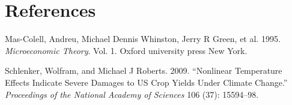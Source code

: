 \documentclass[
  12pt,
  letterpaper,
  DIV=11,
  numbers=noendperiod]{scrartcl}
\newlength{\cslhangindent}
\newlength{\cslentryspacingunit} %
\newenvironment{CSLReferences}[2] %
 {%
  \setlength{\parindent}{0pt}
  \ifodd #1
  \let\oldpar\par
  \def\par{\hangindent=\cslhangindent\oldpar}
  \fi
  \setlength{\parskip}{#2\cslentryspacingunit}
 }%
 {}
\begin{document}
\newpage

\hypertarget{references}{%
\section*{References}\label{references}}

\hypertarget{refs}{}
\begin{CSLReferences}{1}{0}
\leavevmode{}%
Mas-Colell, Andreu, Michael Dennis Whinston, Jerry R Green, et al. 1995.
\emph{Microeconomic Theory}. Vol. 1. Oxford university press New York.

\leavevmode{}%
Schlenker, Wolfram, and Michael J Roberts. 2009. {``Nonlinear
Temperature Effects Indicate Severe Damages to US Crop Yields Under
Climate Change.''} \emph{Proceedings of the National Academy of
Sciences} 106 (37): 15594--98.

\end{CSLReferences}
\end{document}
